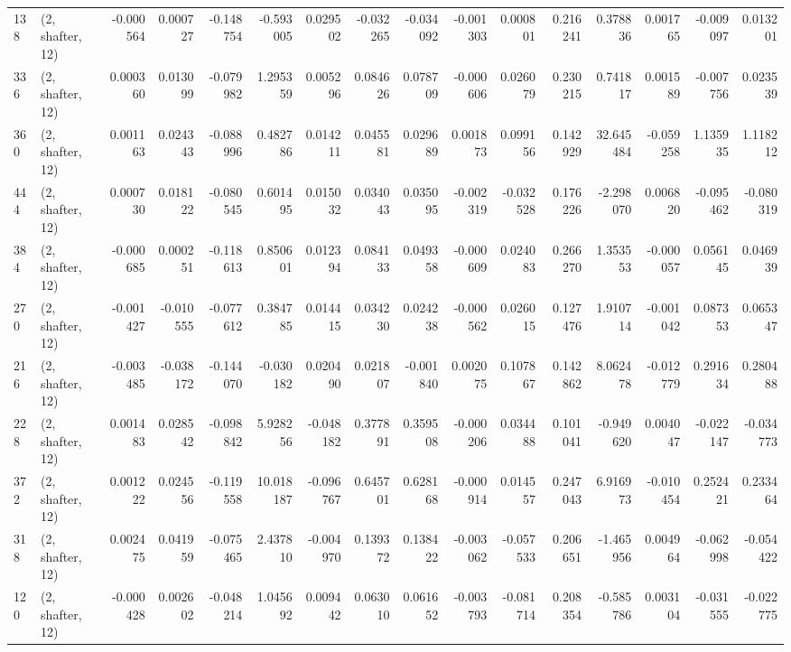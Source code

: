 \begin{tabular}{llrrrrrrrrrrrrrr}
138 &  (2, shafter, 12) &  -0.000564 &  0.000727 & -0.148754 &   -0.593005 &  0.029502 &  -0.032265 & -0.034092 & -0.001303 &  0.000801 &  0.216241 &    0.378836 &  0.001765 & -0.009097 &  0.013201 \\
336 &  (2, shafter, 12) &   0.000360 &  0.013099 & -0.079982 &    1.295359 &  0.005296 &   0.084626 &  0.078709 & -0.000606 &  0.026079 &  0.230215 &    0.741817 &  0.001589 & -0.007756 &  0.023539 \\
360 &  (2, shafter, 12) &   0.001163 &  0.024343 & -0.088996 &    0.482786 &  0.014211 &   0.045581 &  0.029689 &  0.001873 &  0.099156 &  0.142929 &   32.645484 & -0.059258 &  1.135935 &  1.118212 \\
444 &  (2, shafter, 12) &   0.000730 &  0.018122 & -0.080545 &    0.601495 &  0.015032 &   0.034043 &  0.035095 & -0.002319 & -0.032528 &  0.176226 &   -2.298070 &  0.006820 & -0.095462 & -0.080319 \\
384 &  (2, shafter, 12) &  -0.000685 &  0.000251 & -0.118613 &    0.850601 &  0.012394 &   0.084133 &  0.049358 & -0.000609 &  0.024083 &  0.266270 &    1.353553 & -0.000057 &  0.056145 &  0.046939 \\
270 &  (2, shafter, 12) &  -0.001427 & -0.010555 & -0.077612 &    0.384785 &  0.014415 &   0.034230 &  0.024238 & -0.000562 &  0.026015 &  0.127476 &    1.910714 & -0.001042 &  0.087353 &  0.065347 \\
216 &  (2, shafter, 12) &  -0.003485 & -0.038172 & -0.144070 &   -0.030182 &  0.020490 &   0.021807 & -0.001840 &  0.002075 &  0.107867 &  0.142862 &    8.062478 & -0.012779 &  0.291634 &  0.280488 \\
228 &  (2, shafter, 12) &   0.001483 &  0.028542 & -0.098842 &    5.928256 & -0.048182 &   0.377891 &  0.359508 & -0.000206 &  0.034488 &  0.101041 &   -0.949620 &  0.004047 & -0.022147 & -0.034773 \\
372 &  (2, shafter, 12) &   0.001222 &  0.024556 & -0.119558 &   10.018187 & -0.096767 &   0.645701 &  0.628168 & -0.000914 &  0.014557 &  0.247043 &    6.916973 & -0.010454 &  0.252421 &  0.233464 \\
318 &  (2, shafter, 12) &   0.002475 &  0.041959 & -0.075465 &    2.437810 & -0.004970 &   0.139372 &  0.138422 & -0.003062 & -0.057533 &  0.206651 &   -1.465956 &  0.004964 & -0.062998 & -0.054422 \\
120 &  (2, shafter, 12) &  -0.000428 &  0.002602 & -0.048214 &    1.045692 &  0.009442 &   0.063010 &  0.061652 & -0.003793 & -0.081714 &  0.208354 &   -0.585786 &  0.003104 & -0.031555 & -0.022775 \\

\end{tabular}
